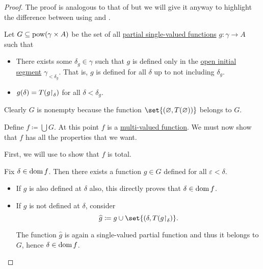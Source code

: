 \begin{proof}
  The proof is analogous to that of  but we will give it anyway to highlight the difference between using  and .

  Let \( G \subseteq \operatorname{pow}(\gamma \times A) \) be the set of all \hyperref[def:partial_function]{partial single-valued functions} \( g: \gamma \to A \) such that
  \begin{itemize}
    \item There exists some \( \delta_g \in \gamma \) such that \( g \) is defined only in the \hyperref[def:partially_ordered_set_interval/ray]{open initial segment} \( \gamma_{< \delta_g} \). That is, \( g \) is defined for all \( \delta \) up to not including \( \delta_g \).

    \item \( g(\delta) = T(g{\upharpoonright}_\delta) \) for all \( \delta < \delta_g \).
  \end{itemize}

  Clearly \( G \) is nonempty because the function \( \set{ (\varnothing, T(\varnothing)) } \) belongs to \( G \).

  Define \( f \coloneqq \bigcup G \). At this point \( f \) is a \hyperref[def:multi_valued_function]{multi-valued function}. We must now show that \( f \) has all the properties that we want.

   First, we will use  to show that \( f \) is total.

  Fix \( \delta \in \operatorname{dom} f \). Then there exists a function \( g \in G \) defined for all \( \varepsilon < \delta \).

  \begin{itemize}
    \item If \( g \) is also defined at \( \delta \) also, this directly proves that \( \delta \in \operatorname{dom} f \).
    \item If \( g \) is not defined at \( \delta \), consider
    \begin{equation*}
      \widehat g \coloneqq g \cup \set{ (\delta, T(g\restr_\delta) }.
    \end{equation*}

    The function \( \widehat g \) is again a single-valued partial function and thus it belongs to \( G \), hence \( \delta \in \operatorname{dom} f \).
  \end{itemize}


\end{proof}
